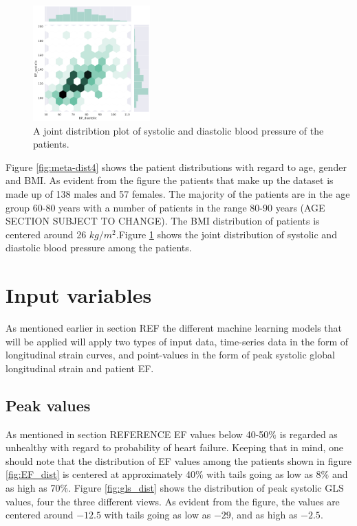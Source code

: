 \begin{figure}
    \begin{center}
    \includegraphics[width=0.4\textwidth]{data-exp/bp.png}
    \end{center}
    \caption{A joint distribtion plot of systolic and diastolic blood pressure of the patients.}
    \label{fig:bp-dist}
\end{figure}

Figure \ref{fig:meta-dist4} shows the patient distributions with regard to age, gender and BMI. As evident from the figure the patients that make up the dataset is made up of 138 males and 57 females. The majority of the patients are in the age group 60-80 years with a number of patients in the range 80-90 years (AGE SECTION SUBJECT TO CHANGE). The BMI distribution of patients is centered around 26 $kg/m^2$.Figure \ref{fig:bp-dist} shows the joint distribution of systolic and diastolic blood pressure among the patients.

\section{Input variables} \label{sec:covariates}
As mentioned earlier in section REF the different machine learning models that will be applied will apply two types of input data, time-series data in the form of longitudinal strain curves, and point-values in the form of peak systolic global longitudinal strain and patient EF.

\subsection{Peak values}
As mentioned in section REFERENCE EF values below 40-50$\%$ is regarded as unhealthy with regard to probability of heart failure. Keeping that in mind, one should note that the distribution of EF values among the patients shown in figure \ref{fig:EF_dist} is centered at approximately 40$\%$ with tails going as low as 8$\%$ and as high as 70$\%$. Figure \ref{fig:gls_dist} shows the distribution of peak systolic GLS values, four the three different views. As evident from the figure, the values are centered around $-12.5$ with tails going as low as $-29$, and as high as $-2.5$. \bigskip

